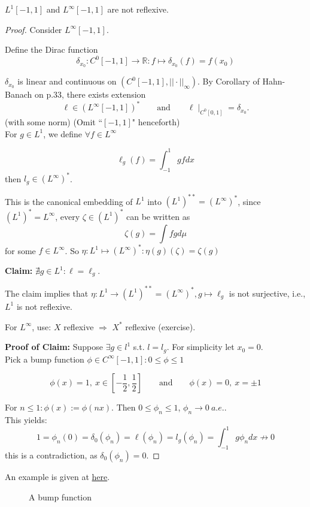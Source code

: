 \documentclass{article}
\begin{document}
\begin{proposition}
    $L^1[-1,1]$ and $L^{\infty}[-1,1]$ are not reflexive.
\end{proposition}
\begin{proof}
Consider $L^\infty[-1,1]$. 

Define the Dirac function 
$$\delta_{x_0}: C^0[-1,1] \rightarrow \mathbb{R}: f \mapsto \delta_{x_0}(f) = f(x_0)$$

$\delta_{x_0}$ is linear and continuous on $(C^0[-1,1],||\cdot ||_\infty)$. By Corollary of Hahn-Banach on p.33, there exists extension 
$$\ell\in (L^\infty [-1,1])^* \qquad \text{and} \qquad \ell\mid_{C^0[0,1]} = \delta_{x_0}.$$
(with some norm) (Omit \textquotedblleft $[-1,1]$" henceforth) \\

For $g\in L^1$, we define $\forall f\in L^\infty$

$$\ell_g(f) = \int_{-1}^1 gf dx$$
then $l_g\in (L^\infty)^*$.

\begin{unexaminable}
This is the canonical embedding of $L^1$ into $(L^1)^{**}=(L^{\infty})^*$, since $(L^1)^* = L^{\infty}$, every $\zeta \in (L^1)^*$ can be written as  
$$
\zeta(g) = \int fg d\mu
$$
for some $f \in L^{\infty}$.  
So $\eta: L^1 \mapsto (L^{\infty})^*:  \eta(g)(\zeta)=\zeta(g)$
\end{unexaminable}

\textbf{Claim:} $\nexists g\in L^1: \ell=\ell_g$.  

The claim implies that $\eta: L^1 \rightarrow (L^1)^{**}=(L^\infty)^*, g \mapsto \ell_g$ is not surjective, i.e., $L^1$ is not reflexive.  

For $L^\infty$, use: $X$ reflexive $\Rightarrow$ $X^*$ reflexive (exercise).  

\textbf{Proof of Claim:} Suppose $\exists g\in l^1$ s.t. $l=l_g$. For simplicity let $x_0=0$.\\
Pick a bump function $\phi \in C^\infty [-1,1]: 0 \leq \phi \leq 1$

$$
\phi(x) = 1, \ x \in [-\frac{1}{2}, \frac{1}{2}] \qquad \text{and} \qquad \phi(x)=0, \ x=\pm 1
$$

For $n\leq 1: \phi(x) := \phi(nx)$. Then $0\leq \phi_n \leq 1$, $\phi_n \rightarrow 0 \ a.e.$.\\
This yields: $$1 = \phi_n(0)=\delta_{0}(\phi_n) = \ell(\phi_n) = l_g(\phi_n) = \int_{-1}^1 g\phi_n dx \nrightarrow 0$$
this is a contradiction, as $\delta_{0}(\phi_n) = 0$.
\end{proof}
\begin{unexaminable}
An example is given at \href{https://math.stackexchange.com/questions/101480/are-there-other-kinds-of-bump-functions-than-e-frac1x2-1}{\color{navyblue} here}.  
\begin{figure}[H]
  \centering
  \makebox[0pt]{%
  
  }
  \caption{A bump function}
\end{figure} 
\end{unexaminable}
\end{document}
